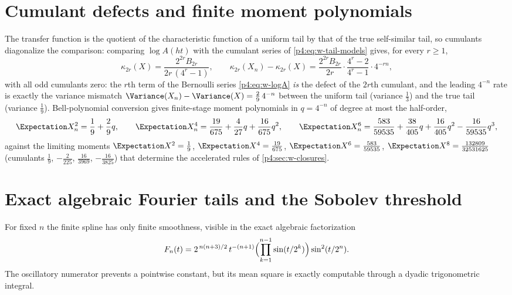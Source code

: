\documentclass[11pt,oneside]{article}
\numberwithin{equation}{section}
\theoremstyle{definition}
\theoremstyle{remark}
\begin{document}
\section{Cumulant defects and finite moment polynomials}
\label{p4:sec:w-cumulants}

The transfer function is the quotient of the characteristic function of a
uniform tail by that of the true self-similar tail, so cumulants
diagonalize the comparison: comparing $\log A(ht)$ with the cumulant series
of \eqref{p4:eq:w-tail-models} gives, for every $r\ge1$,
\begin{equation}
 \kappa_{2r}(X)=\frac{2^{2r}B_{2r}}{2r\,(4^r-1)},
 \qquad
 \kappa_{2r}(X_n)-\kappa_{2r}(X)
 =\frac{2^{2r}B_{2r}}{2r}\cdot
 \frac{4^r-2}{4^r-1}\cdot4^{-rn},
 \label{p4:eq:w-cumulant-defect}
\end{equation}
with all odd cumulants zero: the $r$th term of the Bernoulli series
\eqref{p4:eq:w-logA} \emph{is} the defect of the $2r$th cumulant, and the
leading $4^{-n}$ rate is exactly the variance mismatch
$\Variance(X_n)-\Variance(X)=\tfrac29\,4^{-n}$ between the uniform tail (variance
$\tfrac13$) and the true tail (variance $\tfrac19$).  Bell-polynomial
conversion gives finite-stage moment polynomials in $q=4^{-n}$ of degree at
most the half-order,
\begin{equation}
 \Expectation X_n^2=\frac19+\frac29q,
 \qquad
 \Expectation X_n^4=\frac{19}{675}+\frac4{27}q+\frac{16}{675}q^2,
 \qquad
 \Expectation X_n^6=\frac{583}{59535}+\frac{38}{405}q
 +\frac{16}{405}q^2-\frac{16}{59535}q^3,
 \label{p4:eq:w-moment-polys}
\end{equation}
against the limiting moments
$\Expectation X^2=\tfrac19$, $\Expectation X^4=\tfrac{19}{675}$,
$\Expectation X^6=\tfrac{583}{59535}$, $\Expectation X^8=\tfrac{132809}{32531625}$
(cumulants $\tfrac19$, $-\tfrac2{225}$, $\tfrac{16}{3969}$,
$-\tfrac{16}{3825}$) that determine the accelerated rules of
\cref{p4:sec:w-closures}.

\section{Exact algebraic Fourier tails and the Sobolev threshold}
\label{p4:sec:w-tails}

For fixed $n$ the finite spline has only finite smoothness, visible in the
exact algebraic factorization
\begin{equation}
 F_n(t)=2^{\,n(n+3)/2}\,t^{-(n+1)}
 \Bigl(\prod_{k=1}^{n-1}\sin(t/2^k)\Bigr)\sin^2(t/2^n).
 \label{p4:eq:w-algebraic}
\end{equation}
The oscillatory numerator prevents a pointwise constant, but its mean
square is exactly computable through a dyadic trigonometric integral.
\end{document}
